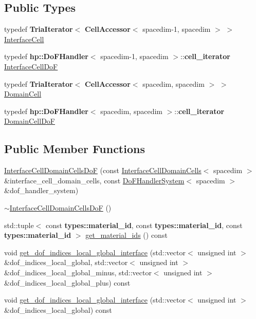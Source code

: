 \subsection*{Public Types}
\begin{DoxyCompactItemize}
\item 
typedef {\bf Tria\+Iterator}$<$ {\bf Cell\+Accessor}$<$ spacedim-\/1, spacedim $>$ $>$ \hyperlink{class_interface_cell_domain_cells_do_f_a55783857b93a31baac5a6e6ee3dad22f}{Interface\+Cell}
\item 
typedef {\bf hp\+::\+Do\+F\+Handler}$<$ spacedim-\/1, spacedim $>$\+::{\bf cell\+\_\+iterator} \hyperlink{class_interface_cell_domain_cells_do_f_a65f6a62d58c8378667cab3df94251ab6}{Interface\+Cell\+DoF}
\item 
typedef {\bf Tria\+Iterator}$<$ {\bf Cell\+Accessor}$<$ spacedim, spacedim $>$ $>$ \hyperlink{class_interface_cell_domain_cells_do_f_a0d0b12a444adb340e1ffc2dd23d77902}{Domain\+Cell}
\item 
typedef {\bf hp\+::\+Do\+F\+Handler}$<$ spacedim, spacedim $>$\+::{\bf cell\+\_\+iterator} \hyperlink{class_interface_cell_domain_cells_do_f_a464c96faf99349555566e4e469fdd34e}{Domain\+Cell\+DoF}
\end{DoxyCompactItemize}
\subsection*{Public Member Functions}
\begin{DoxyCompactItemize}
\item 
\hyperlink{class_interface_cell_domain_cells_do_f_a79a88327d88717a2c3381fe7131b435d}{Interface\+Cell\+Domain\+Cells\+DoF} (const \hyperlink{class_interface_cell_domain_cells}{Interface\+Cell\+Domain\+Cells}$<$ spacedim $>$ \&interface\+\_\+cell\+\_\+domain\+\_\+cells, const \hyperlink{class_do_f_handler_system}{Do\+F\+Handler\+System}$<$ spacedim $>$ \&dof\+\_\+handler\+\_\+system)
\item 
\hyperlink{class_interface_cell_domain_cells_do_f_a090e1536777928b78dff7fa7b1021a1e}{$\sim$\+Interface\+Cell\+Domain\+Cells\+DoF} ()
\item 
std\+::tuple$<$ const {\bf types\+::material\+\_\+id}, const {\bf types\+::material\+\_\+id}, const {\bf types\+::material\+\_\+id} $>$ \hyperlink{class_interface_cell_domain_cells_do_f_af2edacffb796130c2653eea32e6dc71f}{get\+\_\+material\+\_\+ids} () const 
\item 
void \hyperlink{class_interface_cell_domain_cells_do_f_af71f68397bb1a7f1ce028746b250a0d4}{get\+\_\+dof\+\_\+indices\+\_\+local\+\_\+global\+\_\+interface} (std\+::vector$<$ unsigned int $>$ \&dof\+\_\+indices\+\_\+local\+\_\+global, std\+::vector$<$ unsigned int $>$ \&dof\+\_\+indices\+\_\+local\+\_\+global\+\_\+minus, std\+::vector$<$ unsigned int $>$ \&dof\+\_\+indices\+\_\+local\+\_\+global\+\_\+plus) const 
\item 
void \hyperlink{class_interface_cell_domain_cells_do_f_af4d1bb9c64294a83121282863ef0d207}{get\+\_\+dof\+\_\+indices\+\_\+local\+\_\+global\+\_\+interface} (std\+::vector$<$ unsigned int $>$ \&dof\+\_\+indices\+\_\+local\+\_\+global) const 
\end{DoxyCompactItemize}
